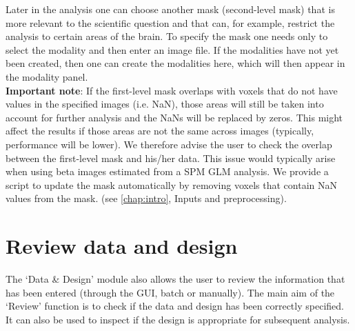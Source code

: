 Later in the analysis one can choose another mask (second-level mask) that is more relevant to the scientific question and that can, for example, restrict the analysis to certain areas of the brain. To specify the mask one needs only to select the modality and then enter an image file. If the modalities have not yet been created, then one can create the modalities here, which will then appear in the modality panel.
\\

\textbf{Important note}: If the first-level mask overlaps with voxels that do not have values in the specified images (i.e. NaN), those areas will still be taken into account for further analysis and the NaNs will be replaced by zeros. This might affect the results if those areas are not the same across images (typically, performance will be lower). We therefore advise the user to check the overlap between the first-level mask and his/her data. This issue would typically arise when using beta images estimated from a SPM GLM analysis. We provide a script to update the mask automatically by removing voxels that contain NaN values from the mask. (see \ref{chap:intro}, Inputs and preprocessing).





\section{Review data and design}

The `Data \& Design' module also allows the user to review the information that has been entered (through the GUI, batch or manually). The main aim of the `Review' function is to check if the data and design has been correctly specified. It can also be used to inspect if the design is appropriate for subsequent analysis.
\\

